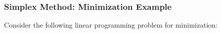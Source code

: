 \documentclass[unicode,11pt,a4paper,oneside,numbers=endperiod,openany]{scrartcl}
\begin{document}
%
%
%
%
%
%
%
%
%
%
%
%
%
%
%

\subsubsection{Simplex Method: Minimization Example}
Consider the following linear programming problem for minimization:
\end{document}
